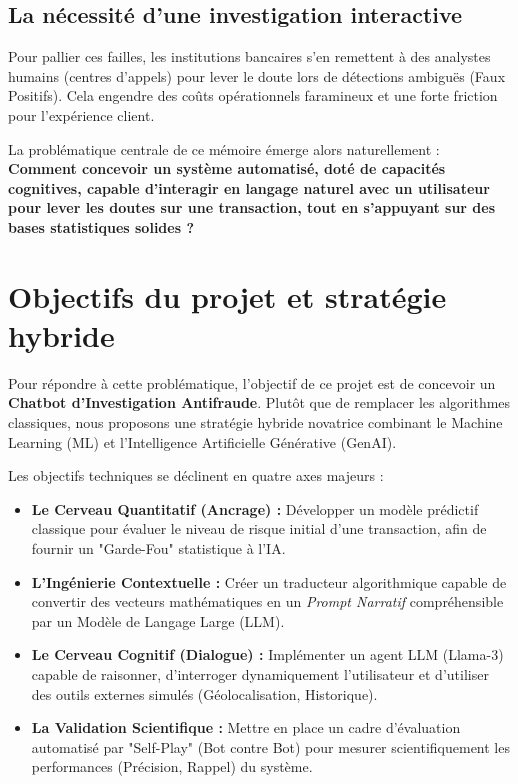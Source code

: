 \documentclass[12pt, a4paper, twoside]{report}
\begin{document}
\subsection{La nécessité d'une investigation interactive}
Pour pallier ces failles, les institutions bancaires s'en remettent à des analystes humains (centres d'appels) pour lever le doute lors de détections ambiguës (Faux Positifs). Cela engendre des coûts opérationnels faramineux et une forte friction pour l'expérience client. 

La problématique centrale de ce mémoire émerge alors naturellement : \textbf{Comment concevoir un système automatisé, doté de capacités cognitives, capable d'interagir en langage naturel avec un utilisateur pour lever les doutes sur une transaction, tout en s'appuyant sur des bases statistiques solides ?}

\section{Objectifs du projet et stratégie hybride}

Pour répondre à cette problématique, l'objectif de ce projet est de concevoir un \textbf{Chatbot d'Investigation Antifraude}. Plutôt que de remplacer les algorithmes classiques, nous proposons une stratégie hybride novatrice combinant le Machine Learning (ML) et l'Intelligence Artificielle Générative (GenAI).

Les objectifs techniques se déclinent en quatre axes majeurs :
\begin{itemize}
    \item \textbf{Le Cerveau Quantitatif (Ancrage) :} Développer un modèle prédictif classique pour évaluer le niveau de risque initial d'une transaction, afin de fournir un "Garde-Fou" statistique à l'IA.
    \item \textbf{L'Ingénierie Contextuelle :} Créer un traducteur algorithmique capable de convertir des vecteurs mathématiques en un \textit{Prompt Narratif} compréhensible par un Modèle de Langage Large (LLM).
    \item \textbf{Le Cerveau Cognitif (Dialogue) :} Implémenter un agent LLM (Llama-3) capable de raisonner, d'interroger dynamiquement l'utilisateur et d'utiliser des outils externes simulés (Géolocalisation, Historique).
    \item \textbf{La Validation Scientifique :} Mettre en place un cadre d'évaluation automatisé par "Self-Play" (Bot contre Bot) pour mesurer scientifiquement les performances (Précision, Rappel) du système.
\end{itemize}
\end{document}
